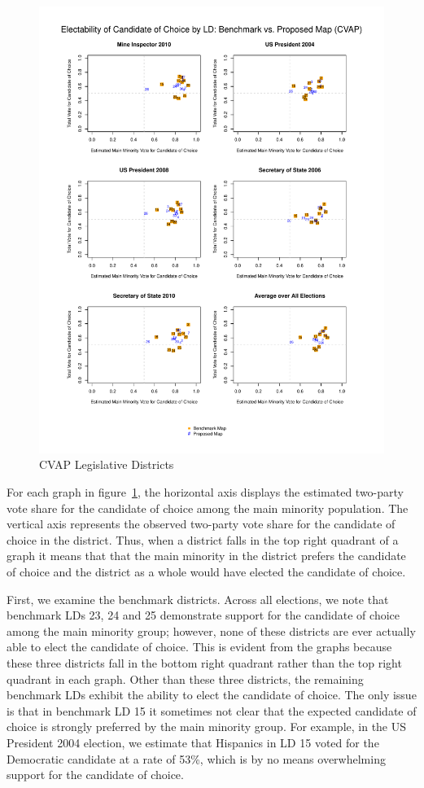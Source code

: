 \documentclass[12pt]{article}
\begin{document}
\begin{figure}[p!h]
\begin{center}
\includegraphics[scale=.8]{figs/cvap_ld.pdf}
\caption{\label{cvap_ld}CVAP Legislative Districts}
\end{center}
\end{figure}

For each graph in figure~\ref{cvap_ld}, the horizontal axis displays the estimated two-party vote share for the candidate of choice among the main minority population. The vertical axis represents the observed two-party vote share for the candidate of choice in the district. Thus, when a district falls in the top right quadrant of a graph it means that that the main minority in the district prefers the candidate of choice and the district as a whole would have elected the candidate of choice. 

First, we examine the benchmark districts. Across all elections, we note that benchmark LDs 23, 24 and 25 demonstrate support for the candidate of choice among the main minority group; however, none of these districts are ever actually able to elect the candidate of choice. This is evident from the graphs because these three districts fall in the bottom right quadrant rather than the top right quadrant in each graph. Other than these three districts, the remaining benchmark LDs exhibit the ability to elect the candidate of choice. The only issue is that in benchmark LD 15 it sometimes not clear that the expected candidate of choice is strongly preferred by the main minority group. For example, in the US President 2004 election, we estimate that Hispanics in LD 15 voted for the Democratic candidate at a rate of 53\%, which is by no means overwhelming support for the candidate of choice. 
\end{document}
